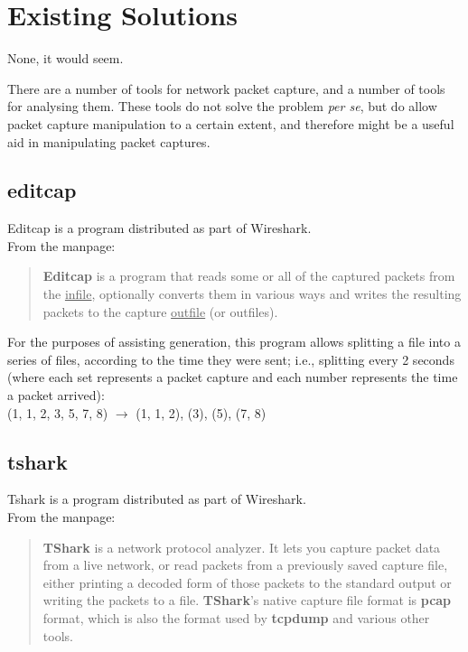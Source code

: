 \documentclass[10pt,a4paper,notitlepage,twoside]{report}
\begin{document}
\pagebreak

\section{Existing Solutions}
\label{sec:existing}
None, it would seem.

There are a number of tools for network packet capture, and a number of tools for analysing them. These tools do not solve the problem \emph{per se}, but do allow packet capture manipulation to a certain extent, and therefore might be a useful aid in manipulating packet captures.

\subsection{editcap}
Editcap is a program distributed as part of Wireshark.\\
From the manpage\cite{editcap-man}:
\begin{quote}
\textbf{Editcap} is a program that reads some or all of the captured packets from the \underline{infile}, optionally converts them in various ways and writes the resulting packets to the capture \underline{outfile} (or outfiles).
\end{quote}

For the purposes of assisting generation, this program allows splitting a file into a series of files, according to the time they were sent; i.e., splitting every 2 seconds (where each set represents a packet capture and each number represents the time a packet arrived):\\
\indent (1, 1, 2, 3, 5, 7, 8) $\rightarrow$ (1, 1, 2), (3), (5), (7, 8)

\subsection{tshark}
Tshark is a program distributed as part of Wireshark.\\
From the manpage\cite{tshark-man}:
\begin{quote}
\textbf{TShark} is a network protocol analyzer. It lets you capture packet data from a live network, or read packets from a previously saved capture file, either printing a decoded form of those packets to the standard output or writing the packets to a file.  \textbf{TShark}'s native capture file format is \textbf{pcap} format, which is also the format used by \textbf{tcpdump} and various other tools.
\end{quote}
\end{document}
